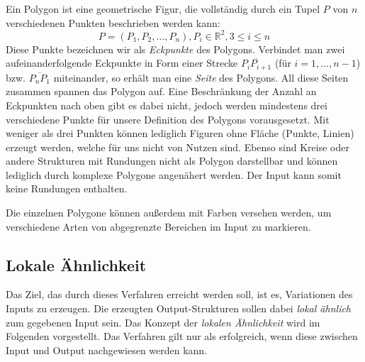 Ein Polygon ist eine geometrische Figur, die vollständig durch ein Tupel \(P\) von \(n\) verschiedenen Punkten beschrieben werden kann:
\[P = (P_1,P_2,\dots,P_n), P_i \in \mathbb{R}^2, 3 \leq i \leq n\]
Diese Punkte bezeichnen wir als \textit{Eckpunkte} des Polygons. Verbindet man zwei
aufeinanderfolgende Eckpunkte in Form einer Strecke \(\overline{P_i P_{i+1}}\) (für \(i = 1,\dots,n-1\)) bzw. \(\overline{P_n P_1}\) miteinander, so
erhält man eine \textit{Seite} des Polygons. All diese Seiten zusammen spannen das Polygon auf. Eine Beschränkung der Anzahl an Eckpunkten
nach oben gibt es dabei nicht, jedoch werden mindestens drei verschiedene Punkte für unsere Definition des Polygons vorausgesetzt. Mit weniger
als drei Punkten können lediglich Figuren ohne Fläche (Punkte, Linien) erzeugt werden, welche für uns nicht von Nutzen sind.
Ebenso sind Kreise oder andere Strukturen mit Rundungen nicht als Polygon darstellbar und können lediglich durch komplexe Polygone angenähert
werden. Der Input kann somit keine Rundungen enthalten.

Die einzelnen Polygone können außerdem mit Farben versehen werden, um verschiedene Arten von abgegrenzte Bereichen im Input zu markieren.

\subsection{Lokale Ähnlichkeit}

Das Ziel, das durch dieses Verfahren erreicht werden soll, ist es, Variationen des Inputs zu erzeugen. Die erzeugten
Output-Strukturen sollen dabei \textit{lokal ähnlich} zum gegebenen Input sein. Das Konzept der \textit{lokalen Ähnlichkeit} wird im Folgenden
vorgestellt. Das Verfahren gilt nur als erfolgreich, wenn diese zwischen Input und Output nachgewiesen werden kann.

